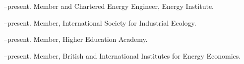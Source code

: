 \documentclass[11pt,a4paper]{article}
\begin{document}



\newpage
\noindent{}%
%
--present.  Member and Chartered Energy Engineer, Energy Institute.

--present.  Member, International Society for Industrial Ecology.

--present.  Member, Higher Education Academy.

--present.  Member, British and International Institutes for Energy Economics.
\end{document}
